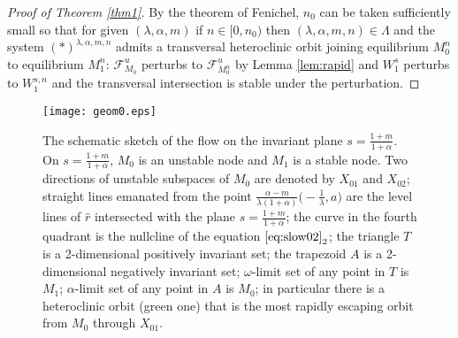 \documentclass[a4paper,11pt]{article}
\theoremstyle{remark}
\begin{document}
\begin{proof}[Proof of Theorem \ref{thm1}] 
 By the theorem of Fenichel, $n_0$ can be taken sufficiently small so that for given $(\lambda,\alpha,m)$ if $n \in [0, n_0)$ then $(\lambda,\alpha,m,n) \in \Lambda$ and  the system $(*)^{\lambda,\alpha,m,n}$ admits a transversal heteroclinic orbit joining equilibrium $M_0^{n}$ to equilibrium $M_1^{n}$: $\mathcal{F}^u_{M_0}$ perturbs to $\mathcal{F}^u_{M_0^n}$ by Lemma \ref{lem:rapid} and $W_1^s$ perturbs to $W_1^{s,n}$ and the transversal intersection is stable under the perturbation. 
\end{proof}
\begin{figure}
 \centering
  \texttt{[image: geom0.eps]} \label{fig:flow0}
  \caption{The schematic sketch of the flow on the invariant plane $s=\frac{1+m}{1+\alpha}$.   On $s=\frac{1+m}{1+\alpha}$, $M_0$ is an unstable node and $M_1$ is a stable node. Two directions of unstable subspaces of $M_0$ are denoted by $X_{01}$ and $X_{02}$; straight lines emanated from the point $\frac{\alpha-m}{\lambda(1+\alpha)}\big(-\frac{1}{\lambda},a\big)$ are the level lines of $\hat{r}$ intersected with the plane $s=\frac{1+m}{1+\alpha}$; the curve in the fourth quadrant is the nullcline of the equation $\eqref{eq:slow02}_2$; the triangle $T$ is a 2-dimensional positively invariant set; the trapezoid $A$ is a 2-dimensional negatively invariant set; $\omega$-limit set of any point in $T$ is $M_1$; $\alpha$-limit set of any point in $A$ is $M_0$; in particular there is a heteroclinic orbit (green one) that is the most rapidly escaping orbit from $M_0$ through $X_{01}$. } 
\end{figure}
\end{document}
